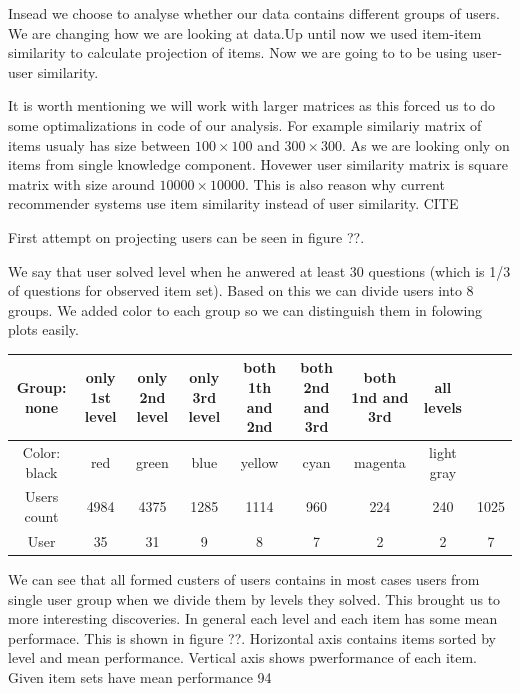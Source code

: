 \documentclass[
  digital, %
  table,   %
  nolof,     %
  nolot,     %
  nocover
]{fithesis3}
\begin{document}
Insead we choose to analyse whether our data contains different groups
of users. We are changing how we are looking at data.Up until now we
used item-item similarity to calculate projection of items. Now we are
going to to be using user-user similarity.

It is worth mentioning we will work with larger matrices as this forced
us to do some optimalizations in code of our analysis. For example
similariy matrix of items usualy has size between $100\times 100$ and
$300\times 300$. As we are looking only on items from single knowledge
component. Hovewer user similarity matrix is square matrix with size
around $10 000\times 10 000$. This is also reason why current
recommender systems use item similarity instead of user similarity. CITE

First attempt on projecting users can be seen in figure ??.


We say that user solved level when he anwered at least 30 questions
(which is 1/3 of questions for observed item set). Based on this we can
divide users into 8 groups. We added color to each group so we can
distinguish them in folowing plots easily.

\begin{center}
  \begin{tabular}{|c|c c c c c c c c|}
    \hline
    Group: none & only 1st level & only 2nd level & only 3rd level & both 1th and 2nd & both 2nd and 3rd & both 1nd and 3rd & all levels \\
    \hline
    Color: black & red & green & blue & yellow & cyan & magenta & light gray \\
    \hline
    Users count & 4984 & 4375 & 1285 & 1114 & 960 & 224 & 240 & 1025 \\
    \hline
    User & 35 & 31 & 9 & 8 & 7 & 2 & 2 & 7 \\
    \hline
  \end{tabular}
\end{center}

We can see that all formed custers of users contains in most cases users
from single user group when we divide them by levels they solved. This
brought us to more interesting discoveries. In general each level and
each item has some mean performace. This is shown in figure ??.
Horizontal axis contains items sorted by level and mean performance.
Vertical axis shows pwerformance of each item. Given item sets have mean
performance 94%
\end{document}

